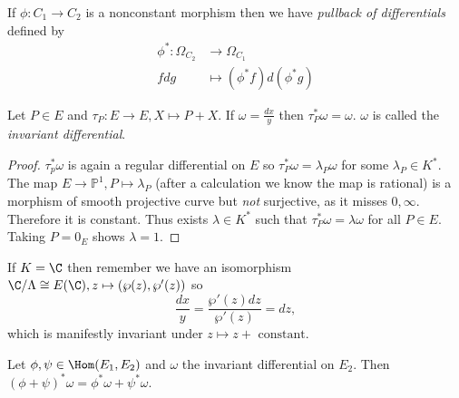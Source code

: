 \documentclass[a4paper]{article}
\theoremstyle{definition}
\renewcommand*{\P}{\mathbb{P}}
\begin{document}
\begin{definition}
  If \(\phi: C_1 \to C_2\) is a nonconstant morphism then we have \emph{pullback of differentials} defined by
  \begin{align*}
    \phi^*: \Omega_{C_2} &\to \Omega_{C_1} \\
    f dg &\mapsto (\phi^* f) d(\phi^*g)
  \end{align*}
\end{definition}

\begin{lemma}
  Let \(P \in E\) and \(\tau_P: E \to E, X \mapsto P + X\). If \(\omega = \frac{dx}{y}\) then \(\tau_P^* \omega = \omega\). \(\omega\) is called the \emph{invariant differential}.
\end{lemma}

\begin{proof}
  \(\tau_p^*\omega\) is again a regular differential on \(E\) so \(\tau_P^* \omega = \lambda_P \omega\) for some \(\lambda_P \in K^*\). The map \(E \to \P^1, P \mapsto \lambda_P\) (after a calculation we know the map is rational) is a morphism of smooth projective curve but \emph{not} surjective, as it misses \(0, \infty\). Therefore it is constant. Thus exists \(\lambda \in K^*\) such that \(\tau_P^* \omega = \lambda \omega\) for all \(P \in E\). Taking \(P = 0_E\) shows \(\lambda = 1\).
\end{proof}

\begin{remark}
  If \(K = \C\) then remember we have an isomorphism \(\C/\Lambda \cong E(\C), z \mapsto (\wp(z), \wp'(z))\) so
  \[
    \frac{dx}{y} = \frac{\wp'(z) dz}{\wp'(z)} = dz,
  \]
  which is manifestly invariant under \(z \mapsto z + \text{ constant}\).
\end{remark}

\begin{lemma}
  Let \(\phi, \psi \in \Hom(E_1, E_2)\) and \(\omega\) the invariant differential on \(E_2\). Then \((\phi + \psi)^* \omega = \phi^*\omega + \psi^*\omega\).
\end{lemma}
\end{document}

